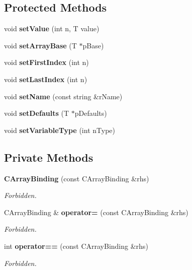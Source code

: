 \subsection*{Protected Methods}
\begin{CompactItemize}
\item 
void {\bf set\-Value} (int n, T value)
\item 
void {\bf set\-Array\-Base} (T $\ast$p\-Base)
\item 
void {\bf set\-First\-Index} (int n)
\item 
void {\bf set\-Last\-Index} (int n)
\item 
void {\bf set\-Name} (const string \&r\-Name)
\item 
void {\bf set\-Defaults} (T $\ast$p\-Defaults)
\item 
void {\bf set\-Variable\-Type} (int n\-Type)
\end{CompactItemize}
\subsection*{Private Methods}
\begin{CompactItemize}
\item 
{\bf CArray\-Binding} (const CArray\-Binding \&rhs)
\begin{CompactList}\small\item\em Forbidden.\item\end{CompactList}\item 
CArray\-Binding \& {\bf operator=} (const CArray\-Binding \&rhs)
\begin{CompactList}\small\item\em Forbidden.\item\end{CompactList}\item 
int {\bf operator==} (const CArray\-Binding \&rhs)
\begin{CompactList}\small\item\em Forbidden.\item\end{CompactList}\end{CompactItemize}
